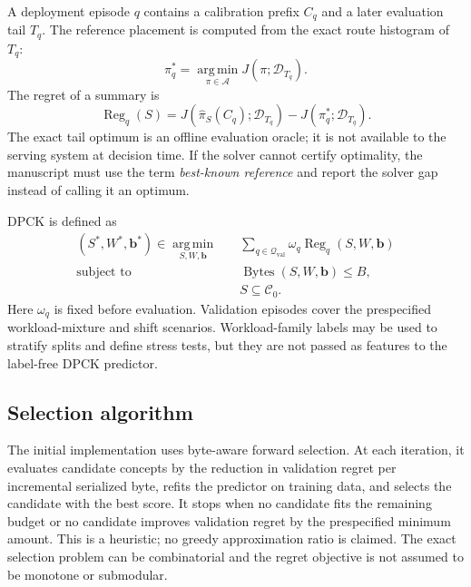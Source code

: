 \documentclass[a4paper,preprint,review,12pt,authoryear]{elsarticle}
\newcommand{\Ccal}{\mathcal{C}}
\newcommand{\Dcal}{\mathcal{D}}
\newcommand{\PiSet}{\mathcal{A}}
\newcommand{\Reg}{\operatorname{Reg}}
\newcommand{\Bytes}{\operatorname{Bytes}}
\newcommand{\argmin}{\operatorname*{arg\,min}}
\begin{document}
A deployment episode $q$ contains a calibration prefix $C_q$ and a later evaluation tail $T_q$. The reference placement is computed from the exact route histogram of $T_q$:
\begin{equation}
 \pi_q^*=\argmin_{\pi\in\PiSet}J(\pi;\Dcal_{T_q}).
\end{equation}
The regret of a summary is
\begin{equation}
 \Reg_q(S)=J(\widehat\pi_S(C_q);\Dcal_{T_q})-J(\pi_q^*;\Dcal_{T_q}).
 \label{eq:regret}
\end{equation}
The exact tail optimum is an offline evaluation oracle; it is not available to the serving system at decision time. If the solver cannot certify optimality, the manuscript must use the term \emph{best-known reference} and report the solver gap instead of calling it an optimum.

DPCK is defined as
\begin{equation}
 \begin{aligned}
 (S^*,W^*,\bm b^*)\in\argmin_{S,W,\bm b}\quad&
 \sum_{q\in\mathcal Q_{\mathrm{val}}}\omega_q\Reg_q(S,W,\bm b)\\
 \text{subject to}\quad&\Bytes(S,W,\bm b)\le B,\\
 &S\subseteq\Ccal_0.
 \end{aligned}
 \label{eq:dpck}
\end{equation}
Here $\omega_q$ is fixed before evaluation. Validation episodes cover the prespecified workload-mixture and shift scenarios. Workload-family labels may be used to stratify splits and define stress tests, but they are not passed as features to the label-free DPCK predictor.

\subsection{Selection algorithm}

The initial implementation uses byte-aware forward selection. At each iteration, it evaluates candidate concepts by the reduction in validation regret per incremental serialized byte, refits the predictor on training data, and selects the candidate with the best score. It stops when no candidate fits the remaining budget or no candidate improves validation regret by the prespecified minimum amount. This is a heuristic; no greedy approximation ratio is claimed. The exact selection problem can be combinatorial and the regret objective is not assumed to be monotone or submodular.
\end{document}
